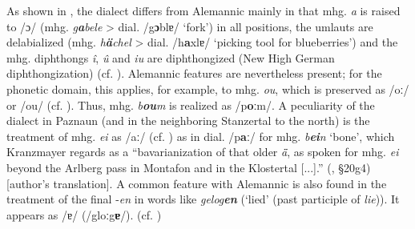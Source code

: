 \documentclass[output=paper]{langscibook}
\begin{document}
As shown in , the dialect differs from Alemannic mainly in that mhg. \textit{a} is raised to /ɔ/ (mhg. \textit{g}\textbf{\textit{a}}\textit{bele} > dial. /g\textbf{ɔ}blɐ/ ‘fork’) in all positions, the umlauts are delabialized (mhg. \textit{h}\textbf{\textit{ä}}\textit{chel} > dial. /h\textbf{a}xlɐ/ ‘picking tool for blueberries’) and the mhg. diphthongs \textit{î}, \textit{û} and \textit{iu} are diphthongized (New High German diphthongization) (cf. \citealt[830--831]{Wiesinger1983}). Alemannic features are nevertheless present; for the phonetic domain, this applies, for example, to mhg. \textit{ou}, which is preserved as /oː/ or /ou/ (cf. \citealt[831, 837]{Wiesinger1983}). Thus, mhg. \textit{b}\textbf{\textit{ou}}\textit{m} is realized as /p\textbf{oː}m/. A peculiarity of the dialect in Paznaun (and in the neighboring Stanzertal to the north) is the treatment of mhg. \textit{ei} as /aː/ (cf. \citealt[837]{Wiesinger1983}) as in dial. /p\textbf{aː}/ for mhg. \textit{b}\textbf{\textit{ei}}\textit{n} ‘bone’, which Kranzmayer regards as a “bavarianization of that older \textit{ǟ}, as spoken for mhg. \textit{ei} beyond the Arlberg pass in Montafon and in the Klostertal [...].” (\cite[60]{Kranzmayer1956}, §20g4) [author’s translation]. A common feature with Alemannic is also found in the treatment of the final -\textit{en} in words like \textit{gelog}\textbf{\textit{en}} (‘lied’ (past participle of \textit{lie})). It appears as /ɐ/ (/glo\textbf{ː}g\textbf{ɐ}/). (cf. \cites[22, 92]{Schatz1903}[115(§46h1)]{Kranzmayer1956}) 
\end{document}
